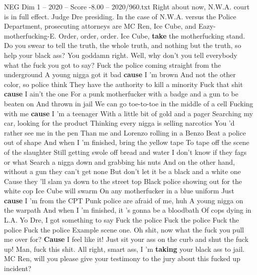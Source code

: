 \begin{textsample}{NEG Dim 1 – 2020 – Score -8.00 – 2020/960.txt}  \label{ex:f1_neg_035}
Right about now, N.W.A. court is in full effect.
Judge Dre presiding.
In the case of N.W.A. versus the Police Department, prosecuting attorneys are MC Ren, Ice Cube, and Eazy-motherfucking-E.
Order, order, order.
Ice Cube, \textbf{take} the motherfucking stand.
Do you swear to tell the truth, the whole truth, and nothing but the truth, so help your black ass?
You goddamn right.
Well, why don't you tell everybody what the fuck you got to say?
Fuck the police coming straight from the underground A young nigga got it bad \textbf{cause} I 'm brown And not the other color, so police think They have the authority to kill a minority Fuck that shit \textbf{cause} I ain't the one For a punk motherfucker with a badge and a gun to be beaten on And thrown in jail We can go toe-to-toe in the middle of a cell Fucking with me \textbf{cause} I 'm a teenager With a little bit of gold and a pager Searching my car, looking for the product Thinking every nigga is selling narcotics You 'd rather see me in the pen Than me and Lorenzo rolling in a Benzo Beat a police out of shape And when I 'm finished, bring the yellow tape To tape off the scene of the slaughter Still getting swole off bread and water I don't know if they fags or what Search a nigga down and grabbing his nuts And on the other hand, without a gun they can't get none But don't let it be a black and a white one Cause they 'll slam ya down to the street top Black police showing out for the white cop Ice Cube will swarm On any motherfucker in a blue uniform Just \textbf{cause} I 'm from the CPT Punk police are afraid of me, huh A young nigga on the warpath And when I 'm finished, it 's gonna be a bloodbath Of cops dying in L.A.
Yo Dre, I got something to say Fuck the police Fuck the police Fuck the police Fuck the police Example scene one.
Oh shit, now what the fuck you pull me over for? \textbf{Cause} I feel like it!
Just sit your ass on the curb and shut the fuck up!
Man, fuck this shit.
All right, smart ass, I 'm \textbf{taking} your black ass to jail.
MC Ren, will you please give your testimony to the jury about this fucked up incident?

\end{textsample}
